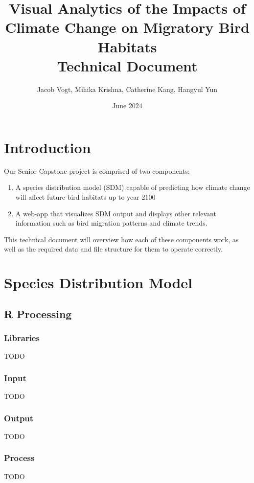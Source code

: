 \documentclass{article}
\title{Visual Analytics of the Impacts of Climate Change on 
Migratory Bird Habitats \\
 \Large{Technical Document}}
\author{Jacob Vogt, Mihika Krishna, Catherine Kang, Hangyul Yun}
\date{June 2024}
\begin{document}
\maketitle

\tableofcontents

\newpage

\section{Introduction}
Our Senior Capstone project is comprised of two components:

\begin{enumerate}
  \item A species distribution model (SDM) capable of predicting how climate change will affect future bird habitats up to year 2100
  \item A web-app that visualizes SDM output and displays other relevant information such as bird migration patterns and climate trends.
\end{enumerate}

This technical document will overview how each of these components work, as well as the required data and file structure for them to operate correctly.

\newpage

\section{Species Distribution Model}

\subsection{R Processing}

\subsubsection*{Libraries}
TODO

\subsubsection*{Input}
TODO

\subsubsection*{Output}
TODO

\subsubsection*{Process}
TODO
\end{document}
